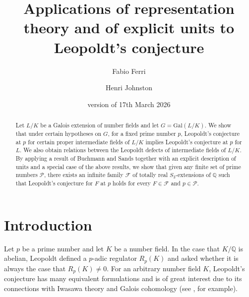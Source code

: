 \documentclass[12pt]{amsart}
\title[Representation theory, explicit units, and Leopoldt's conjecture]{Applications of representation theory and of explicit units to Leopoldt's conjecture}
\author{Fabio Ferri}
\author{Henri Johnston}
\date{version of 17th March 2026}
\theoremstyle{plain}
\theoremstyle{remark}
\theoremstyle{definition}
\newcommand{\Q}{\mathbb{Q}}
\newcommand{\Gal}{\mathrm{Gal}}
\numberwithin{equation}{section}
\begin{document}
\maketitle

\begin{abstract}
Let $L/K$ be a Galois extension of number fields
and let $G=\Gal(L/K)$.
We show that under certain hypotheses on $G$, 
for a fixed prime number $p$, Leopoldt's conjecture at $p$ for certain proper intermediate fields of 
$L/K$ implies Leopoldt's conjecture at $p$ for $L$. 
We also obtain relations between the Leopoldt defects of intermediate fields of $L/K$.
By applying a result of Buchmann and Sands together with an explicit description of units and a
special case of the above results,  
we show that given any finite set of prime numbers $\mathcal{P}$,
there exists an infinite family $\mathcal{F}$ of totally real 
$S_{3}$-extensions of $\Q$ such that Leopoldt's conjecture for $F$ at $p$ holds for every 
$F \in \mathcal{F}$ and $p \in \mathcal{P}$.
\end{abstract}

\section{Introduction}\label{sec:intro}

Let $p$ be a prime number and let $K$ be a number field. 
In the case that $K/\Q$ is abelian, Leopoldt \cite{MR139602} defined a $p$-adic regulator 
$R_{p}(K)$ and asked whether it is always the case that $R_{p}(K) \neq 0$.
For an arbitrary number field $K$, Leopoldt's conjecture has many equivalent formulations
and is of great interest due to its connections with Iwasawa theory and Galois cohomology
(see \cite[Chapters X and XI]{MR2392026}, for example).
\end{document}
